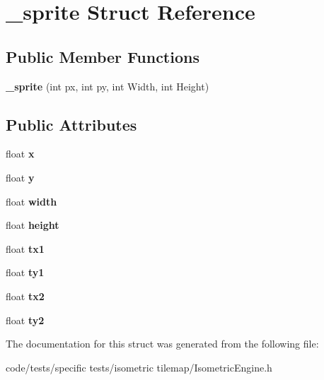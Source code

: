 \hypertarget{struct__sprite}{\section{\-\_\-sprite Struct Reference}
\label{struct__sprite}
}
\subsection*{Public Member Functions}
\begin{DoxyCompactItemize}
\item 
\hypertarget{struct__sprite_a1197a7e0ff8568633d3f448245b56c4f}{{\bfseries \-\_\-sprite} (int px, int py, int Width, int Height)}\label{struct__sprite_a1197a7e0ff8568633d3f448245b56c4f}

\end{DoxyCompactItemize}
\subsection*{Public Attributes}
\begin{DoxyCompactItemize}
\item 
\hypertarget{struct__sprite_afac6458e382c43835b606bd2c75ef257}{float {\bfseries x}}\label{struct__sprite_afac6458e382c43835b606bd2c75ef257}

\item 
\hypertarget{struct__sprite_a9d334cb08a540229212c9a35020f34e4}{float {\bfseries y}}\label{struct__sprite_a9d334cb08a540229212c9a35020f34e4}

\item 
\hypertarget{struct__sprite_a6f0575ae13fa0d23a850831ef5c96770}{float {\bfseries width}}\label{struct__sprite_a6f0575ae13fa0d23a850831ef5c96770}

\item 
\hypertarget{struct__sprite_a8bb3cf7096b3080ba84636a23e4e54cf}{float {\bfseries height}}\label{struct__sprite_a8bb3cf7096b3080ba84636a23e4e54cf}

\item 
\hypertarget{struct__sprite_a9233cad8e6e14d784cb9c7ef32b84e01}{float {\bfseries tx1}}\label{struct__sprite_a9233cad8e6e14d784cb9c7ef32b84e01}

\item 
\hypertarget{struct__sprite_aa7679017ab4f32a368a2afb692ea7b93}{float {\bfseries ty1}}\label{struct__sprite_aa7679017ab4f32a368a2afb692ea7b93}

\item 
\hypertarget{struct__sprite_af385576fb167e410e8a675454fae80a5}{float {\bfseries tx2}}\label{struct__sprite_af385576fb167e410e8a675454fae80a5}

\item 
\hypertarget{struct__sprite_a8e8d92e61cc25fdf49fa94d601f43934}{float {\bfseries ty2}}\label{struct__sprite_a8e8d92e61cc25fdf49fa94d601f43934}

\end{DoxyCompactItemize}


The documentation for this struct was generated from the following file\-:\begin{DoxyCompactItemize}
\item 
code/tests/specific tests/isometric tilemap/Isometric\-Engine.\-h\end{DoxyCompactItemize}
